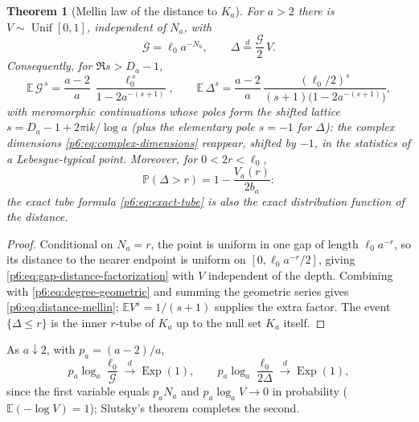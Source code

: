 \documentclass[11pt,oneside]{article}
\numberwithin{equation}{section}
\newtheorem{theorem}{Theorem}[section]
\theoremstyle{definition}
\theoremstyle{remark}
\newcommand{\E}{\mathbb E}
\newcommand{\Prob}{\mathbb P}
\newcommand{\ii}{\mathrm i}
\begin{document}
\begin{theorem}[Mellin law of the distance to $K_a$]
\label{p6:thm:distance-mellin}
For $a>2$ there is $V\sim\operatorname{Unif}[0,1]$, independent of $N_a$,
with
\begin{equation}\label{p6:eq:gap-distance-factorization}
 \mathcal G=\ell_0a^{-N_a},
 \qquad
 \Delta\overset d=\frac{\mathcal G}2\,V .
\end{equation}
Consequently, for $\Re s>D_a-1$,
\begin{equation}\label{p6:eq:distance-mellin}
 \E\,\mathcal G^{\,s}
 =\frac{a-2}{a}\,\frac{\ell_0^{\,s}}{1-2a^{-(s+1)}},
 \qquad
 \E\,\Delta^{s}
 =\frac{a-2}{a}\,
 \frac{(\ell_0/2)^{s}}{(s+1)\bigl(1-2a^{-(s+1)}\bigr)},
\end{equation}
with meromorphic continuations whose poles form the shifted lattice
$s=D_a-1+2\pi\ii k/\log a$ (plus the elementary pole $s=-1$ for $\Delta$):
the complex dimensions \eqref{p6:eq:complex-dimensions} reappear, shifted by
$-1$, in the statistics of a Lebesgue-typical point.  Moreover, for
$0<2r<\ell_0$,
\begin{equation}\label{p6:eq:distance-tail-tube}
 \Prob(\Delta>r)=1-\frac{V_a(r)}{2b_a}:
\end{equation}
the exact tube formula \eqref{p6:eq:exact-tube} is also the exact
distribution function of the distance.
\end{theorem}

\begin{proof}
Conditional on $N_a=r$, the point is uniform in one gap of length
$\ell_0a^{-r}$, so its distance to the nearer endpoint is uniform on
$[0,\ell_0a^{-r}/2]$, giving \eqref{p6:eq:gap-distance-factorization} with
$V$ independent of the depth.  Combining with
\eqref{p6:eq:degree-geometric} and summing the geometric series gives
\eqref{p6:eq:distance-mellin}; $\E V^s=1/(s+1)$ supplies the extra factor.
The event $\{\Delta\le r\}$ is the inner $r$-tube of $K_a$ up to the null set
$K_a$ itself.
\end{proof}

\begin{corollary}
\label{p6:cor:critical-gap-scale}
As $a\downarrow2$, with $p_a=(a-2)/a$,
\[
 p_a\log_a\frac{\ell_0}{\mathcal G}
 \xrightarrow{\ d\ }\operatorname{Exp}(1),
 \qquad
 p_a\log_a\frac{\ell_0}{2\Delta}
 \xrightarrow{\ d\ }\operatorname{Exp}(1),
\]
since the first variable equals $p_aN_a$ and
$p_a\log_a V\to0$ in probability ($\E(-\log V)=1$); Slutsky's theorem
completes the second.
\end{corollary}
\end{document}
